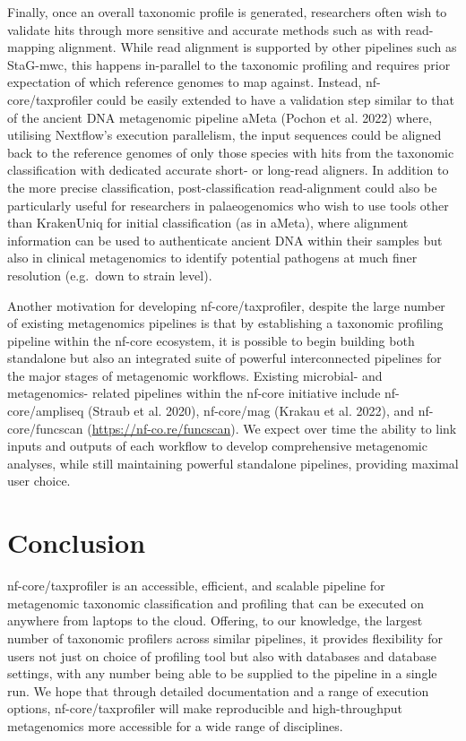 \documentclass[
]{article}
\begin{document}
Finally, once an overall taxonomic profile is generated, researchers
often wish to validate hits through more sensitive and accurate methods
such as with read-mapping alignment. While read alignment is supported
by other pipelines such as StaG-mwc, this happens in-parallel to the
taxonomic profiling and requires prior expectation of which reference
genomes to map against. Instead, nf-core/taxprofiler could be easily
extended to have a validation step similar to that of the ancient DNA
metagenomic pipeline aMeta (Pochon et al. 2022) where, utilising
Nextflow's execution parallelism, the input sequences could be aligned
back to the reference genomes of only those species with hits from the
taxonomic classification with dedicated accurate short- or long-read
aligners. In addition to the more precise classification,
post-classification read-alignment could also be particularly useful for
researchers in palaeogenomics who wish to use tools other than
KrakenUniq for initial classification (as in aMeta), where alignment
information can be used to authenticate ancient DNA within their samples
but also in clinical metagenomics to identify potential pathogens at
much finer resolution (e.g.~down to strain level).

Another motivation for developing nf-core/taxprofiler, despite the large
number of existing metagenomics pipelines is that by establishing a
taxonomic profiling pipeline within the nf-core ecosystem, it is
possible to begin building both standalone but also an integrated suite
of powerful interconnected pipelines for the major stages of metagenomic
workflows. Existing microbial- and metagenomics- related pipelines
within the nf-core initiative include nf-core/ampliseq (Straub et al.
2020), nf-core/mag (Krakau et al. 2022), and nf-core/funcscan
(\url{https://nf-co.re/funcscan}). We expect over time the ability to
link inputs and outputs of each workflow to develop comprehensive
metagenomic analyses, while still maintaining powerful standalone
pipelines, providing maximal user choice.

\hypertarget{conclusion}{%
\section{Conclusion}\label{conclusion}}

nf-core/taxprofiler is an accessible, efficient, and scalable pipeline
for metagenomic taxonomic classification and profiling that can be
executed on anywhere from laptops to the cloud. Offering, to our
knowledge, the largest number of taxonomic profilers across similar
pipelines, it provides flexibility for users not just on choice of
profiling tool but also with databases and database settings, with any
number being able to be supplied to the pipeline in a single run. We
hope that through detailed documentation and a range of execution
options, nf-core/taxprofiler will make reproducible and high-throughput
metagenomics more accessible for a wide range of disciplines.
\end{document}
